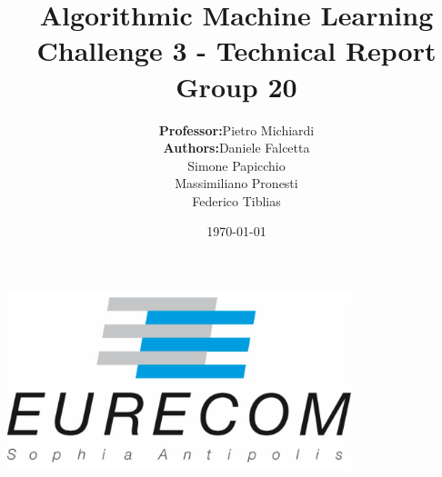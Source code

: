 \title{\Large Algorithmic Machine Learning  \\[0.5cm]
	\bf\Large Challenge 3 - Technical Report \\[0.5cm]
	
	\bf\Large Group 20}

\author{\large 
	\begin{tabular}{rl}
		\textbf{Professor:} & Pietro Michiardi \\
		\textbf{Authors:} & Daniele Falcetta \\ & Simone Papicchio \\ & Massimiliano Pronesti \\ & Federico Tiblias
	\end{tabular}
	}
\date{\large \today}

\makeatletter
\begin{titlepage}
	\begin{center}
		{ \includegraphics[width=10cm]{../../eurecom.png}}
		{\ \\ \ \\}
		\vbox{}\vspace{5cm}
		{\@title }\\[3cm]
		{\@author}\\[3cm]
		{\@date\\}
		
	\end{center}
\end{titlepage}
\makeatother